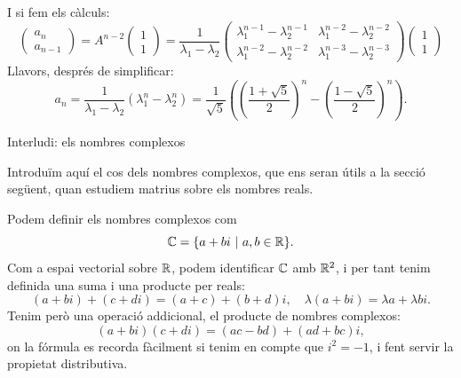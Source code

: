\documentclass[
  11pt,
]{book}
\makeatletter
\numberwithin{dummy}{section}
\theoremstyle{maincolornumbox}
\theoremstyle{blacknumex}
\theoremstyle{blacknumbox}
\theoremstyle{maincolornum}
\renewcommand{\section}{\@startsection{section}{1}{\z@}
{-4ex \@plus -1ex \@minus -.4ex}
{1ex \@plus.2ex }
{\normalfont\large\sffamily\bfseries}}
\newlength\esp
\makeatother
\begin{document}
\[%
\] I si fem els càlculs: \[\begin{pmatrix}
a_n\\a_{n-1}
\end{pmatrix}=
A^{n-2} \begin{pmatrix} 1 \\ 1 \end{pmatrix}=
\frac{1}{\lambda_1-\lambda_2} \begin{pmatrix}
\lambda_1^{n-1}-\lambda_2^{n-1} &
\lambda_1^{n-2}-\lambda_2^{n-2} \\
\lambda_1^{n-2}-\lambda_2^{n-2} &
\lambda_1^{n-3}-\lambda_2^{n-3} 
\end{pmatrix}\begin{pmatrix} 1 \\ 1 \end{pmatrix}
\] Llavors, després de simplificar:
\[a_n= \frac{1}{\lambda_1-\lambda_2}(\lambda_1^n-\lambda_2^n)=\frac{1}{\sqrt{5}}\left(
\left(\frac{1+\sqrt{5}}{2}\right)^n-\left(\frac{1-\sqrt{5}}{2}\right)^n
\right).
\]

\section{Interludi: els nombres complexos}\label{sec:complexos}

Introduïm aquí el cos dels nombres complexos, que ens seran útils a la
secció següent, quan estudiem matrius sobre els nombres reals.

Podem definir els nombres complexos com \[\mathbb{C} =\{a+bi ~|~ a,b\in\mathbb{R}\}.\]
Com a espai vectorial sobre \(\mathbb{R}\), podem identificar \(\mathbb{C}\) amb \(\mathbb{R}^2\), i
per tant tenim definida una suma i una producte per reals:
\[(a+bi) + (c+di) = (a+c) + (b+d)i, \quad \lambda(a+bi)=\lambda a + \lambda b i.\]
Tenim però una operació addicional, el producte de nombres complexos:
\[(a+bi)(c+di) = (ac-bd) + (ad+bc)i,\] on la fórmula es recorda
fàcilment si tenim en compte que \(i^2=-1\), i fent servir la propietat
distributiva.
\end{document}
